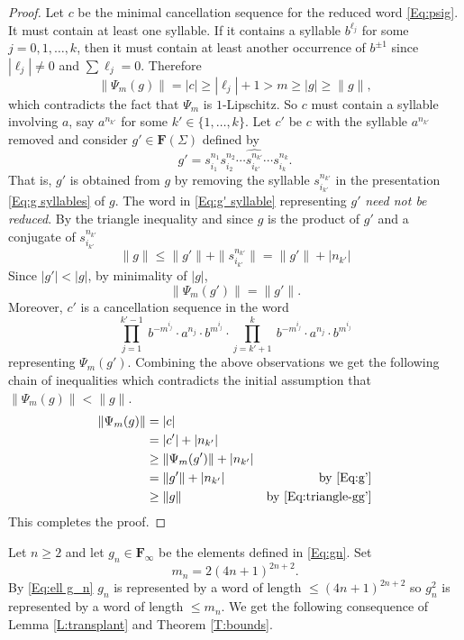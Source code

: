 \documentclass[12pt,reqno,a4paper]{article}
\theoremstyle{definition}
\theoremstyle{remark}
\numberwithin{equation}{section}
\numberwithin{figure}{section}
\newcommand{\B}[1]{{\mathbf #1}}
\begin{document}
\begin{proof}
Let $c$ be the minimal cancellation sequence for the reduced word \eqref{Eq:psig}.
It must contain at least one syllable. If it contains a syllable $b^{\ell_j}$ for
some $j=0,1,\ldots,k$, then it must contain at least another occurrence of $b^{\pm 1}$ since $|\ell_j| \neq 0$ and $\sum \ell_j = 0$.
Therefore 
$$
\|\Psi_m(g)\| = |c| \geq |\ell_j| + 1 > m  \geq  |g| \geq \|g\|, 
$$
which contradicts the fact that $\Psi_m$ is $1$-Lipschitz. So $c$ must contain
a syllable involving $a$, say $a^{n_{k'}}$ for some $k'\in\{1,\ldots,k\}$.
Let $c'$ be $c$ with the syllable $a^{n_{k'}}$ removed and consider $g' \in \B F(\Sigma)$ defined by 
\begin{equation}\label{Eq:g' syllable}
g' = s_{i_1}^{n_1}s_{i_2}^{n_2}\cdots \widehat{s_{i_{k'}}^{n_{k'}}}\cdots s_{i_k}^{n_k}.
\end{equation}
That is, $g'$ is obtained from $g$ by removing the syllable $s_{i_{k'}}^{n_{k'}}$ in the presentation \eqref{Eq:g syllables} of $g$.
The word in \eqref{Eq:g' syllable} representing $g'$ {\em need not be reduced}.
By the triangle inequality and since $g$ is the product of $g'$ and a conjugate of $s_{i_{k'}}^{n_{k'}}$
\begin{equation}
\|g\| \leq \|g'\|+\| s_{i_{k'}}^{n_{k'}} \| = \|g'\|+|n_{k'}|
\label{Eq:triangle-gg'}
\end{equation}
Since $|g'|<|g|$, by  minimality of $|g|$, 
\begin{equation}
\|\Psi_m(g')\| = \|g'\|.
\label{Eq:g'}
\end{equation}
Moreover, $c'$ is a cancellation sequence in the word
$$
\prod_{j=1}^{k'-1}\ b^{-m^{i_j}}\cdot a^{n_j}\cdot b^{m^{i_j}}\cdot
\prod_{j=k'+1}^{k}\ b^{-m^{i_j}}\cdot a^{n_j}\cdot b^{m^{i_j}}
$$
representing $\Psi_m(g')$. Combining the above observations we get the
following chain of inequalities which contradicts the initial assumption
that $\|\Psi_m(g)\|<\|g\|$.
\begin{align*}
\|\Psi_m(g)\| &= |c|\\ 
&= |c'|+|n_{k'}| \\
& \geq \|\Psi_m(g')\|+|n_{k'}| \\
&= \|g'\|+|n_{k'}| &\text{by \eqref{Eq:g'}}\\
&\geq \|g\| & \text{by \eqref{Eq:triangle-gg'}}
\end{align*}
This completes the proof.
\end{proof}


Let $n\geq 2$ and let $g_n\in \B F_{\infty}$ be the elements defined in \eqref{Eq:gn}.
Set 
\[
m_n=2(4n+1)^{2n+2}.
\] 
By \eqref{Eq:ell g_n} $g_n$ is represented by a word of length $\leq (4n+1)^{2n+2}$ so $g_n^2$ is represented by a word of length $\leq m_n$. 
We get the following consequence of Lemma \ref{L:transplant} and Theorem \ref{T:bounds}.
\end{document}
